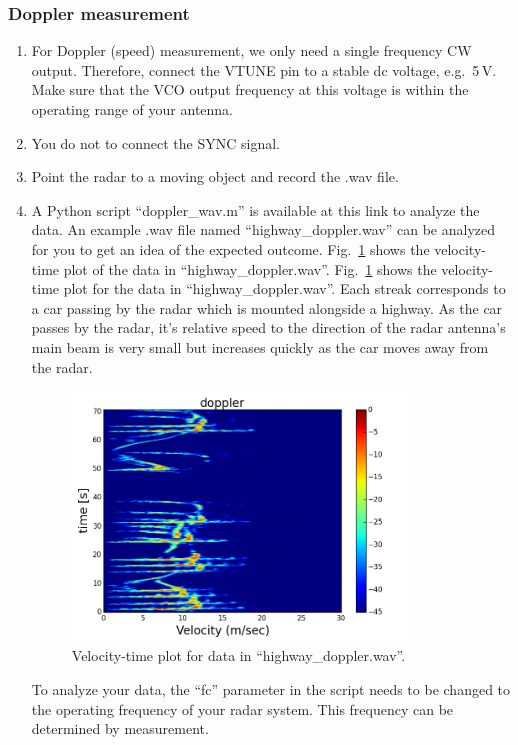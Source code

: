 \documentclass[letterpaper, 11pt]{article}
\begin{document}
\subsubsection{Doppler measurement}
	\begin{enumerate}
		\item For Doppler (speed) measurement, we only need a single frequency CW output. Therefore, connect the VTUNE pin to a stable dc voltage, e.g.~5\,V. Make sure that the VCO output frequency at this voltage is within the operating range of your antenna. 
		
		\item You do not to connect the SYNC signal. 
		
		\item  Point the radar to a moving object and record the .wav file. 
		
		\item A Python script ``doppler\_wav.m'' is available at this link to analyze the data. An example .wav file named ``highway\_doppler.wav'' can be analyzed for you to get an idea of the expected outcome. Fig.~\ref{fig:doppler} shows the velocity-time plot of the data in ``highway\_doppler.wav''. Fig.~\ref{fig:doppler} shows the velocity-time plot for the data in ``highway\_doppler.wav''. Each streak corresponds to a car passing by the radar which is mounted alongside a highway. As the car passes by the radar, it's relative speed to the direction of the radar antenna's main beam is very small but increases quickly as the car moves away from the radar. 
		
		\begin{figure}[h]
			\centering
			\includegraphics[width=3.5in]{doppler.png}
			\caption{Velocity-time plot for data in ``highway\_doppler.wav''.} 
			\label{fig:doppler}
		\end{figure} 	
		
		To analyze your data, the ``fc'' parameter in the script needs to be changed to the operating frequency of your radar system. This frequency can be determined by measurement. 
		

\end{enumerate}
\end{document}
